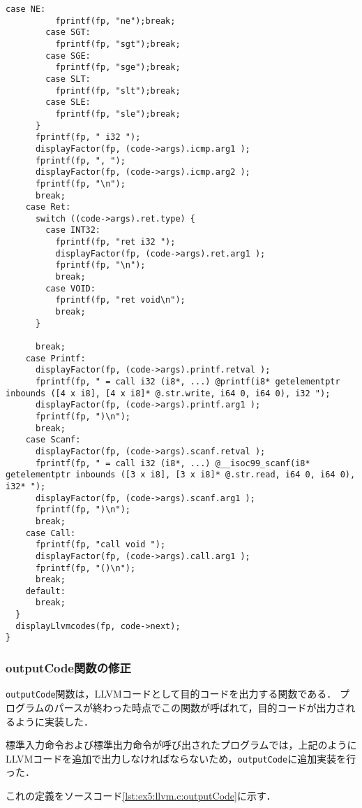 \documentclass[uplatex]{jsarticle}
\begin{document}
\begin{lstlisting}[caption=displayLlvmcodes関数の定義,label=lst:ex5:llvm.c:displayLlvmcodes]
        case NE:
          fprintf(fp, "ne");break;
        case SGT:
          fprintf(fp, "sgt");break;
        case SGE:
          fprintf(fp, "sge");break;
        case SLT:
          fprintf(fp, "slt");break;
        case SLE:
          fprintf(fp, "sle");break;
      }
      fprintf(fp, " i32 ");
      displayFactor(fp, (code->args).icmp.arg1 );
      fprintf(fp, ", ");
      displayFactor(fp, (code->args).icmp.arg2 );
      fprintf(fp, "\n");
      break;
    case Ret:
      switch ((code->args).ret.type) {
        case INT32:
          fprintf(fp, "ret i32 ");
          displayFactor(fp, (code->args).ret.arg1 );
          fprintf(fp, "\n");
          break;
        case VOID:
          fprintf(fp, "ret void\n");
          break;
      }

      break;
    case Printf:
      displayFactor(fp, (code->args).printf.retval );
      fprintf(fp, " = call i32 (i8*, ...) @printf(i8* getelementptr inbounds ([4 x i8], [4 x i8]* @.str.write, i64 0, i64 0), i32 ");
      displayFactor(fp, (code->args).printf.arg1 );
      fprintf(fp, ")\n");
      break;
    case Scanf:
      displayFactor(fp, (code->args).scanf.retval );
      fprintf(fp, " = call i32 (i8*, ...) @__isoc99_scanf(i8* getelementptr inbounds ([3 x i8], [3 x i8]* @.str.read, i64 0, i64 0), i32* ");
      displayFactor(fp, (code->args).scanf.arg1 );
      fprintf(fp, ")\n");
      break;
    case Call:
      fprintf(fp, "call void ");
      displayFactor(fp, (code->args).call.arg1 );
      fprintf(fp, "()\n");
      break;
    default:
      break;
  }
  displayLlvmcodes(fp, code->next);
}
\end{lstlisting}


\subsubsection{outputCode関数の修正}
\verb#outputCode#関数は，LLVMコードとして目的コードを出力する関数である．
プログラムのパースが終わった時点でこの関数が呼ばれて，目的コードが出力されるように実装した．

標準入力命令および標準出力命令が呼び出されたプログラムでは，上記のようにLLVMコードを追加で出力しなければならないため，\verb#outputCode#に追加実装を行った．

これの定義をソースコード\ref{lst:ex5:llvm.c:outputCode}に示す．
\end{document}
